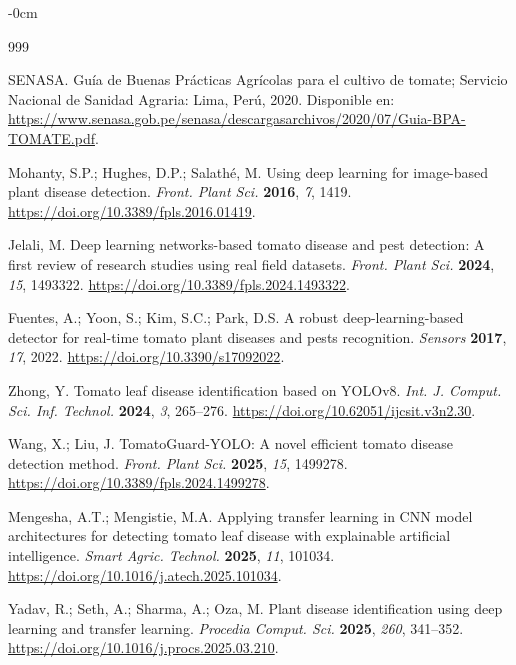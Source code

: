 \documentclass[sensors,article,submit,pdftex,moreauthors]{Definitions/mdpi}
\begin{document}

\begin{adjustwidth}{-\extralength}{0cm}
\begin{thebibliography}{999}

SENASA. Guía de Buenas Prácticas Agrícolas para el cultivo de tomate; Servicio Nacional de Sanidad Agraria: Lima, Perú, 2020. Disponible en: \url{https://www.senasa.gob.pe/senasa/descargasarchivos/2020/07/Guia-BPA-TOMATE.pdf}.

Mohanty, S.P.; Hughes, D.P.; Salath\'e, M. Using deep learning for image-based plant disease detection. {\em Front. Plant Sci.} {\bf 2016}, {\em 7}, 1419. \url{https://doi.org/10.3389/fpls.2016.01419}.

Jelali, M. Deep learning networks-based tomato disease and pest detection: A first review of research studies using real field datasets. {\em Front. Plant Sci.} {\bf 2024}, {\em 15}, 1493322. \url{https://doi.org/10.3389/fpls.2024.1493322}.

Fuentes, A.; Yoon, S.; Kim, S.C.; Park, D.S. A robust deep-learning-based detector for real-time tomato plant diseases and pests recognition. {\em Sensors} {\bf 2017}, {\em 17}, 2022. \url{https://doi.org/10.3390/s17092022}.

Zhong, Y. Tomato leaf disease identification based on YOLOv8. {\em Int. J. Comput. Sci. Inf. Technol.} {\bf 2024}, {\em 3}, 265--276. \url{https://doi.org/10.62051/ijcsit.v3n2.30}.

Wang, X.; Liu, J. TomatoGuard-YOLO: A novel efficient tomato disease detection method. {\em Front. Plant Sci.} {\bf 2025}, {\em 15}, 1499278. \url{https://doi.org/10.3389/fpls.2024.1499278}.

Mengesha, A.T.; Mengistie, M.A. Applying transfer learning in CNN model architectures for detecting tomato leaf disease with explainable artificial intelligence. {\em Smart Agric. Technol.} {\bf 2025}, {\em 11}, 101034. \url{https://doi.org/10.1016/j.atech.2025.101034}.

Yadav, R.; Seth, A.; Sharma, A.; Oza, M. Plant disease identification using deep learning and transfer learning. {\em Procedia Comput. Sci.} {\bf 2025}, {\em 260}, 341--352. \url{https://doi.org/10.1016/j.procs.2025.03.210}.


\end{thebibliography}
\end{adjustwidth}
\end{document}
